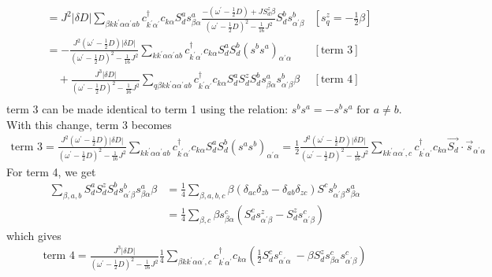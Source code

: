 \documentclass[12pt]{article}
\begin{document}
\begin{equation}
\begin{aligned}
							   &= J^2 |\delta D|\sum_{\beta k k^\prime \alpha \alpha^\prime a b} c^\dagger_{k^\prime\alpha^\prime}c_{k\alpha} S_d^a s^a_{\beta \alpha} \frac{-\left(\omega^\prime - \frac{1}{2}D\right) + J S_d^z \beta}{\left(\omega^\prime - \frac{1}{2}D\right)^2 - \frac{1}{16}J^2} S_d^b s^b_{\alpha^\prime \beta} & \left[s_q^z = -\frac{1}{2}\beta\right] \\
							   &= -\frac{J^2\left(\omega^\prime - \frac{1}{2}D\right)|\delta D|}{\left(\omega^\prime - \frac{1}{2}D\right)^2 - \frac{1}{16}J^2}\sum_{k k^\prime \alpha \alpha^\prime a b} c^\dagger_{k^\prime\alpha^\prime}c_{k\alpha} S_d^a  S_d^b \left(s^b s^a\right)_{\alpha^\prime \alpha} & \left[\text{term 3}\right] \\
							   &\quad+ \frac{J^3|\delta D|}{\left(\omega^\prime - \frac{1}{2}D\right)^2 - \frac{1}{16}J^2} \sum_{q\beta k k^\prime \alpha \alpha^\prime a b} c^\dagger_{k^\prime\alpha^\prime}c_{k\alpha} S_d^a S_d^z S_d^b s^a_{\beta \alpha} s^b_{\alpha^\prime \beta} \beta & \left[\text{term 4}\right] \\
\end{aligned}\end{equation}
term 3 can be made identical to term 1 using the relation: \(s^b s^a = -s^b s^a \text{ for } a \neq b\). With this change, term 3 becomes
\begin{equation}\begin{aligned}
	\text{term 3} = \frac{J^2\left(\omega^\prime - \frac{1}{2}D\right)|\delta D|}{\left(\omega^\prime - \frac{1}{2}D\right)^2 - \frac{1}{16}J^2}\sum_{k k^\prime \alpha \alpha^\prime a b} c^\dagger_{k^\prime\alpha^\prime}c_{k\alpha} S_d^a  S_d^b \left(s^a s^b\right)_{\alpha^\prime \alpha} = \frac{1}{2}\frac{J^2\left(\omega^\prime - \frac{1}{2}D\right)|\delta D|}{\left(\omega^\prime - \frac{1}{2}D\right)^2 - \frac{1}{16}J^2} \sum_{k k^\prime \alpha \alpha^\prime,c} c^\dagger_{k^\prime\alpha^\prime} c_{k\alpha} \vec{S_d}\cdot\vec{s}_{\alpha^\prime \alpha}
\end{aligned}\end{equation}
For term 4, we get
\begin{equation}\begin{aligned}
	\sum_{\beta,a,b} S_d^a S_d^z S_d^b s^b_{\alpha^\prime \beta} s^a_{\beta \alpha} \beta &= \frac{1}{4}\sum_{\beta,a,b,c}\beta\left(\delta_{ac}\delta_{zb} - \delta_{ab}\delta_{zc}\right) S^cs^b_{\alpha^\prime \beta} s^a_{\beta \alpha} \\
																&= \frac{1}{4}\sum_{\beta,c}\beta s^c_{\beta\alpha}\left(S^c_d s^z_{\alpha^\prime\beta} - S^z_d s^c_{\alpha^\prime\beta}\right)
\end{aligned}\end{equation}
which gives
\begin{equation}\begin{aligned}
	\text{term 4} = \frac{J^3|\delta D|}{\left(\omega^\prime - \frac{1}{2}D\right)^2 - \frac{1}{16}J^2} \frac{1}{4}\sum_{\beta k k^\prime \alpha \alpha^\prime,c} c^\dagger_{k^\prime\alpha^\prime} c_{k\alpha} \left(\frac{1}{2}S_d^c s^c_{\alpha^\prime\alpha}\ - \beta S_d^z s^c_{\beta\alpha}s^c_{\alpha^\prime\beta}\right)
\end{aligned}\end{equation}
\end{document}
